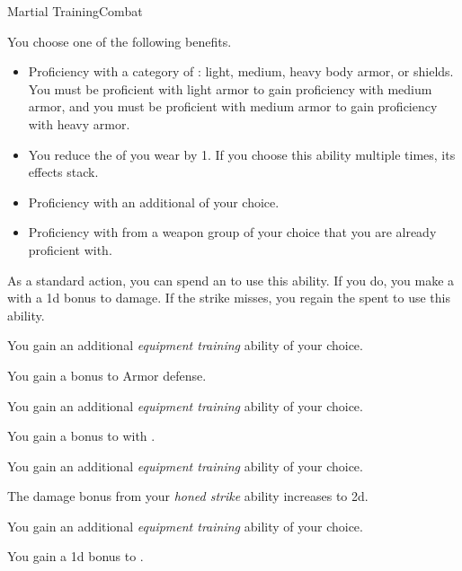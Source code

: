     \begin{feat}{Martial Training}{Combat}
        \featben

         You choose one of the following benefits.
        \begin{itemize}
            \item Proficiency with a category of : light, medium, heavy body armor, or shields.
                You must be proficient with light armor to gain proficiency with medium armor, and you must be proficient with medium armor to gain proficiency with heavy armor.
            \item You reduce the  of  you wear by 1.
                If you choose this ability multiple times, its effects stack.
            \item Proficiency with an additional  of your choice.
            \item Proficiency with  from a weapon group of your choice that you are already proficient with.
        \end{itemize}

         As a standard action, you can spend an  to use this ability.
        If you do, you make a  with a \plus1d bonus to damage.
        If the strike misses, you regain the  spent to use this ability.

         You gain an additional \textit{equipment training} ability of your choice.

         You gain a  bonus to Armor defense.

         You gain an additional \textit{equipment training} ability of your choice.

         You gain a  bonus to  with .
    
         You gain an additional \textit{equipment training} ability of your choice.

         The damage bonus from your \textit{honed strike} ability increases to \plus2d.

         You gain an additional \textit{equipment training} ability of your choice.

         You gain a \plus1d bonus to .
        
    \end{feat}

